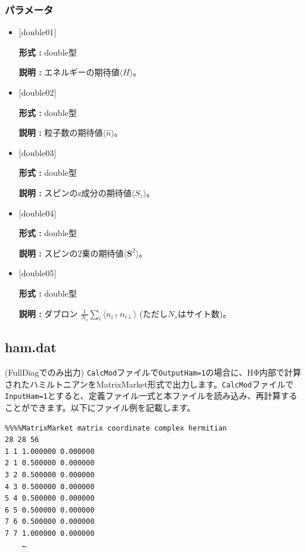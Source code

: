 \subsubsection{パラメータ}
 \begin{itemize}

  \item  $[$double01$]$
  
 {\bf 形式 :} double型

{\bf 説明 :} エネルギーの期待値$\langle H\rangle$。
 
  \item $[$double02$]$

 {\bf 形式 :} double型 

{\bf 説明 :}  粒子数の期待値$\langle \hat{n}\rangle$。

  \item $[$double03$]$

 {\bf 形式 :} double型 

{\bf 説明 :}  スピンのz成分の期待値$\langle S_z\rangle$。

  \item $[$double04$]$

 {\bf 形式 :} double型 

{\bf 説明 :}  スピンの2乗の期待値$\langle {\bm S}^2\rangle$。

  \item $[$double05$]$

 {\bf 形式 :} double型 

{\bf 説明 :}  ダブロン
$\frac{1}{N_s} \sum_{i}\langle n_{i\uparrow}n_{i\downarrow}\rangle$ (ただし$N_s$はサイト数)。


 \end{itemize}


\newpage
\subsection{ham.dat}
\label{Subsec:ham}
(FullDiagでのみ出力) \verb$CalcMod$ファイルで\verb$OutputHam=1$の場合に、HΦ内部で計算されたハミルトニアンをMatrixMarket形式で出力します。\verb$CalcMod$ファイルで\verb$InputHam=1$とすると、定義ファイル一式と本ファイルを読み込み、再計算することができます。以下にファイル例を記載します。

\begin{minipage}{12.5cm}
\begin{screen}
\begin{verbatim}
%%%%MatrixMarket matrix coordinate complex hermitian
28 28 56
1 1 1.000000 0.000000
2 1 0.500000 0.000000
3 2 0.500000 0.000000
4 3 0.500000 0.000000
5 4 0.500000 0.000000
6 5 0.500000 0.000000
7 6 0.500000 0.000000
7 7 1.000000 0.000000
    …
\end{verbatim}
\end{screen}
\end{minipage}


